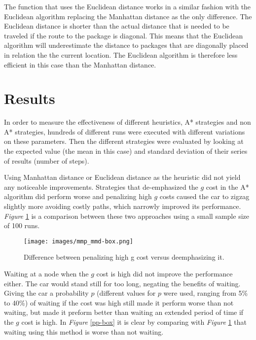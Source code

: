 \documentclass[12pt, a4paper]{article}
\begin{document}
The function that uses the Euclidean distance works in a similar fashion with the Euclidean algorithm replacing the Manhattan distance as the only difference. The Euclidean distance is shorter than the actual distance that is needed to be traveled if the route to the package is diagonal. This means that the Euclidean algorithm will underestimate the distance to packages that are diagonally placed in relation the the current location. The Euclidean algorithm is therefore less efficient in this case than the Manhattan distance. 

\section{Results}

In order to measure the effectiveness of different heuristics, A* strategies and non A* strategies, hundreds of different runs were executed with different variations on these parameters. Then the different strategies were evaluated by looking at the expected value (the mean in this case) and standard deviation of their series of results (number of steps). 

Using Manhattan distance or Euclidean distance as the heuristic did not yield any noticeable improvements. Strategies that de-emphasized the $g$ cost in the A* algorithm did perform worse and penalizing high $g$ costs caused the car to zigzag slightly more avoiding costly paths, which narrowly improved its performance. \textit{Figure} \ref{mmp_mmd-box} is a comparison between these two approaches using a small sample size of 100 runs. 

\begin{figure}[!ht]
\centering
\texttt{[image: images/mmp\_mmd-box.png]}\\
\caption{Difference between penalizing high g cost versus deemphasizing it.}
\label{mmp_mmd-box}
\end{figure}
\vspace{2.5mm}

Waiting at a node when the $g$ cost is high did not improve the performance either. The car would stand still for too long, negating the benefits of waiting. Giving the car a probability $p$ (different values for $p$ were used, ranging from 5\% to 40\%) of waiting if the cost was high still made it perform worse than not waiting, but made it preform better than waiting an extended period of time if the $g$ cost is high. In \textit{Figure} \ref{pp-box} it is clear by comparing with \textit{Figure} \ref{mmp_mmd-box} that waiting using this method is worse than not waiting.
\newpage
\end{document}
